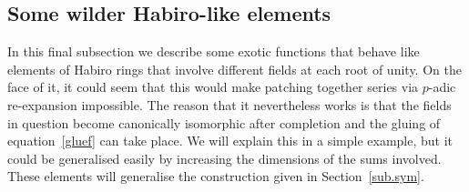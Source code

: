 \documentclass[12pt,reqno]{amsart}
\theoremstyle{definition}
\begin{document}
\subsection{Some wilder Habiro-like elements}

In this final subsection we describe some exotic functions that behave like elements
of Habiro rings that involve different fields at each root of unity. On the face of
it, it could seem that this would make patching together series via $p$-adic
re-expansion impossible.
The reason that it nevertheless works is that the fields in question become
canonically isomorphic after completion and the gluing of equation~\eqref{gluef}
can take place.
We will explain this in a simple example, but it could be generalised \hbox{easily} by
increasing the dimensions of the sums involved.
These elements will generalise the construction given in Section~\ref{sub.sym}.

\medskip
\end{document}
